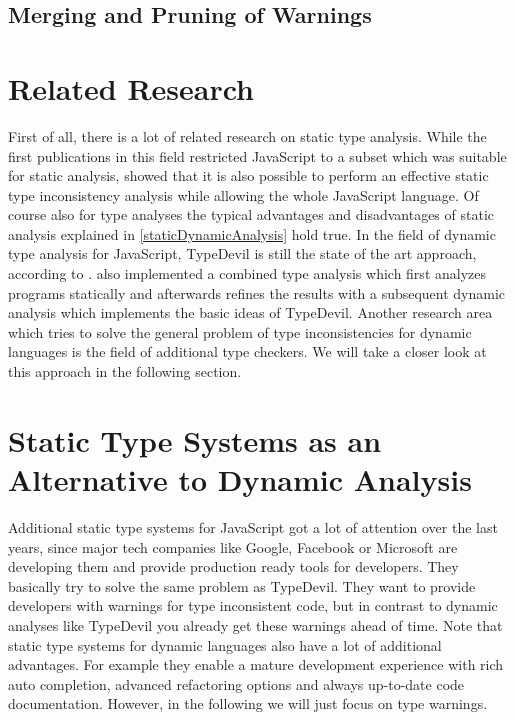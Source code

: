 \documentclass[runningheads,a4paper]{llncs}
\begin{document}
\subsection{Merging and Pruning of Warnings}


\section{Related Research}

First of all, there is a lot of related research on static type analysis.
While the first publications in this field restricted JavaScript to a subset which was suitable for static analysis, \cite{DBLP:conf/sas/JensenMT09} showed that it is also possible to perform an effective static type inconsistency analysis while allowing the whole JavaScript language.
Of course also for type analyses the typical advantages and disadvantages of static analysis explained in \ref{staticDynamicAnalysis} hold true.
In the field of dynamic type analysis for JavaScript, TypeDevil is still the state of the art approach, according to \cite{DBLP:conf/icse/TanXCLYS17}. 
\cite{DBLP:conf/icse/TanXCLYS17} also implemented a combined type analysis which first analyzes programs statically and afterwards refines the results with a subsequent dynamic analysis which implements the basic ideas of TypeDevil.
Another research area which tries to solve the general problem of type inconsistencies for dynamic languages is the field of additional type checkers.
We will take a closer look at this approach in the following section.

\section{Static Type Systems as an Alternative to Dynamic Analysis}

Additional static type systems for JavaScript got a lot of attention over the last years, since major tech companies like Google, Facebook or Microsoft are developing them and provide production ready tools for developers.
They basically try to solve the same problem as TypeDevil.
They want to provide developers with warnings for type inconsistent code, but in contrast to dynamic analyses like TypeDevil you already get these warnings ahead of time.
Note that static type systems for dynamic languages also have a lot of additional advantages.
For example they enable a mature development experience with rich auto completion, advanced refactoring options and always up-to-date code documentation.
However, in the following we will just focus on type warnings.
\end{document}
